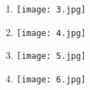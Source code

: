 \begin{question}
  
   \begin{enumerate}[label=\alph*)]
   		\item 
   		\begin{minipage}[H]{\linewidth}                       
			\texttt{[image: 3.jpg]}   		
       \end{minipage}
   		\item 
   		\begin{minipage}[H]{\linewidth}                       
			\texttt{[image: 4.jpg]}   		
       \end{minipage}	
   		\item 
       \begin{minipage}[H]{\linewidth}                       
			\texttt{[image: 5.jpg]}   		
       \end{minipage}
   		\item 
   	   \begin{minipage}[H]{\linewidth}                       
			\texttt{[image: 6.jpg]}   		
       \end{minipage}
   \end{enumerate}
\end{question}

\newpage